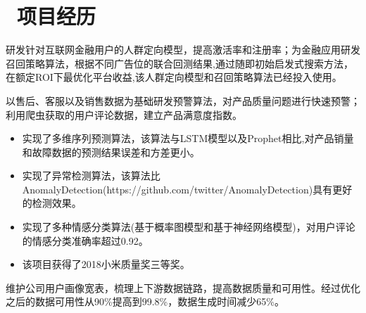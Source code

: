 \documentclass{resume}
\begin{document}

\section{\faUsers\ 项目经历}

\begin{onehalfspacing}
研发针对互联网金融用户的人群定向模型，提高激活率和注册率；为金融应用研发召回策略算法，根据不同广告位的联合回测结果,通过随即初始启发式搜索方法，在额定ROI下最优化平台收益,该人群定向模型和召回策略算法已经投入使用。
\end{onehalfspacing}


\begin{onehalfspacing}
以售后、客服以及销售数据为基础研发预警算法，对产品质量问题进行快速预警；利用爬虫获取的用户评论数据，建立产品满意度指数。
\begin{itemize}
  \item 实现了多维序列预测算法，该算法与LSTM模型以及Prophet相比,对产品销量和故障数据的预测结果误差和方差更小。
  \item 实现了异常检测算法，该算法比AnomalyDetection(https://github.com/twitter/AnomalyDetection)具有更好的检测效果。
  \item 实现了多种情感分类算法(基于概率图模型和基于神经网络模型)，对用户评论的情感分类准确率超过0.92。
  \item 该项目获得了2018小米质量奖三等奖。
\end{itemize}
\end{onehalfspacing}




\begin{onehalfspacing}
维护公司用户画像宽表，梳理上下游数据链路，提高数据质量和可用性。经过优化之后的数据可用性从90\%提高到99.8\%，数据生成时间减少65\%。
\end{onehalfspacing}
\end{document}
